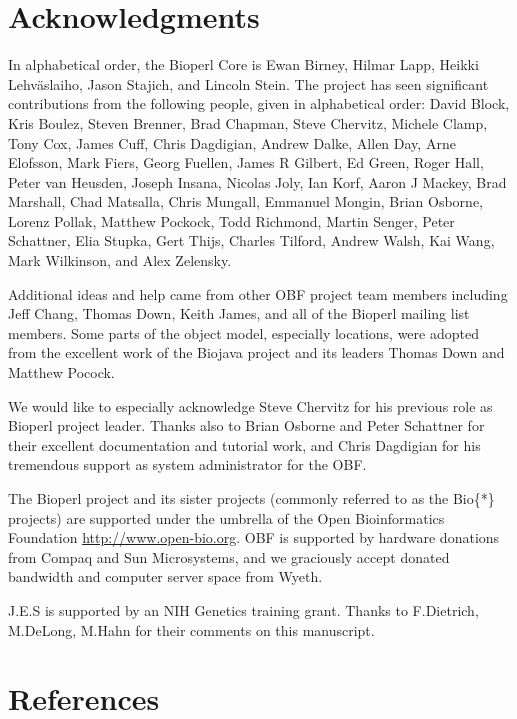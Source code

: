 \documentclass[12pt]{article}
\begin{document}
\section{Acknowledgments}

In alphabetical order, the Bioperl Core is Ewan Birney, Hilmar Lapp, Heikki Lehv\"{a}slaiho,
Jason Stajich, and Lincoln Stein.  The project has seen significant
contributions from the following people, given in alphabetical order:
David Block, Kris Boulez, Steven Brenner, Brad Chapman, Steve
Chervitz, Michele Clamp, Tony Cox, James Cuff, Chris Dagdigian, Andrew
Dalke, Allen Day, Arne Elofsson, Mark Fiers, Georg Fuellen, James R
Gilbert, Ed Green, Roger Hall, Peter van Heusden, Joseph Insana,
Nicolas Joly, Ian Korf, Aaron J Mackey, Brad Marshall, Chad Matsalla,
Chris Mungall, Emmanuel Mongin, Brian Osborne, Lorenz Pollak, Matthew
Pockock, Todd Richmond, Martin Senger, Peter Schattner, Elia Stupka,
Gert Thijs, Charles Tilford, Andrew Walsh, Kai Wang, Mark Wilkinson,
and Alex Zelensky.

Additional ideas and help came from other OBF project team members
including Jeff Chang, Thomas Down, Keith James, and all of the Bioperl
mailing list members.  Some parts of the object model, especially
locations, were adopted from the excellent work of the Biojava project
and its leaders Thomas Down and Matthew Pocock.

We would like to especially acknowledge Steve Chervitz for his
previous role as Bioperl project leader.  Thanks also to Brian Osborne
and Peter Schattner for their excellent documentation and tutorial
work, and Chris Dagdigian for his tremendous support as system
administrator for the OBF.

The Bioperl project and its sister projects (commonly referred to as
the Bio\{*\} projects) are supported under the umbrella of the Open
Bioinformatics Foundation \url{http://www.open-bio.org}.
OBF is supported by hardware donations from Compaq and Sun
Microsystems, and we graciously accept donated bandwidth and computer
server space from Wyeth.

J.E.S is supported by an NIH Genetics training grant.  Thanks to
F.Dietrich, M.DeLong, M.Hahn for their comments on this manuscript.

\section{References}


 
\end{document}
